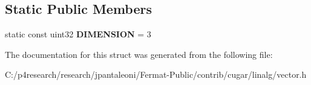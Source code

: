 \subsection*{Static Public Members}
\begin{DoxyCompactItemize}
\item 
\mbox{\label{structcugar_1_1_vector_3_01_t_00_013_01_4_a2ff7d9b74b917a884897da5c1a529257}} 
static const uint32 {\bfseries D\+I\+M\+E\+N\+S\+I\+ON} = 3
\end{DoxyCompactItemize}


The documentation for this struct was generated from the following file\+:\begin{DoxyCompactItemize}
\item 
C\+:/p4research/research/jpantaleoni/\+Fermat-\/\+Public/contrib/cugar/linalg/vector.\+h\end{DoxyCompactItemize}
